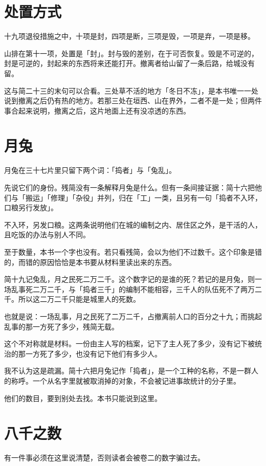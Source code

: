 \section{处置方式}

十九项退役措施之中，十项是封，四项是断，三项是毁，一项是弃，一项是移。

山排在第十一项，处置是「封」。封与毁的差别，在于可否恢复。毁是不可逆的，封是可逆的，封起来的东西将来还能打开。撤离者给山留了一条后路，给城没有留。

这与简二十三的末句可以合看。三处草不活的地方「冬日不冻」，是本书唯一一处说到撤离之后仍有热的地方。若那三处在垣西、山在界外，二者不是一处；但两件事合起来说明，撤离之后，这片地面上还有没凉透的东西。

\section{月兔}

月兔在三十七片里只留下两个词：「捣者」与「兔乱」。

先说它们的身份。残简没有一条解释月兔是什么。但有一条间接证据：简十六把他们与「搬运」「修理」「杂役」并列，归在「工」一类，且另有一句「捣者不入环，口粮另行发放」。

不入环，另发口粮。这两条说明他们在城的编制之内、居住区之外，是干活的人，且吃饭的办法与别人不同。

至于数量，本书一个字也没有。若只看残简，会以为他们不过数千。这个印象是错的，而错的原因恰恰是本书要从材料里读出来的东西。

简十九记兔乱，月之民死二万二千。这个数字记的是谁的死？若记的是月兔，则一场乱事死二万二千，与「捣者三千」的编制不能相容，三千人的队伍死不了两万二千。所以这二万二千只能是城里人的死数。

也就是说：一场乱事，月之民死了二万二千，占撤离前人口的百分之十九；而挑起乱事的那一方死了多少，残简无载。

这个不对称就是材料。一份由主人写的档案，记下了主人死了多少，没有记下被统治的那一方死了多少，也没有记下他们有多少人。

我不认为这是疏漏。简十六把月兔记作「捣者」，是一个工种的名称，不是一群人的称呼。一个从名字里就被取消掉的对象，不会被记进事故统计的分子里\nobreak。

他们的数目，要到别处去找。本书只能说到这里。

\section{八千之数}

有一件事必须在这里说清楚，否则读者会被卷二的数字骗过去。

